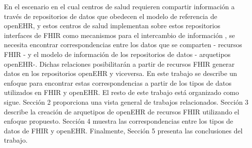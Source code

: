 En el escenario en el cual centros de salud requieren compartir información a través de repositorios de datos que obedecen el modelo de referencia de openEHR, y estos centros de salud implementan sobre estos repositorios interfaces de FHIR como mecanismos para el intercambio de información \cite{Lopez16}, se necesita encontrar correspondencias entre los datos que se comparten - recursos FHIR - y el modelo de información de los repositorios de datos - arquetipos openEHR-. Dichas relaciones posibilitarán a partir de recursos FHIR generar datos en los repositorios openEHR y viceversa. En este trabajo se describe un enfoque para encontrar estas correspondencias a partir de los tipos de datos utilizados en FHIR y openEHR. El resto de este trabajo está organizado como sigue. Sección 2 proporciona una vista general de trabajos relacionados. Sección 3 describe la creación de arquetipos de openEHR de recursos FHIR utilizando el enfoque propuesto. Sección 4 muestra las correspondencias entre los tipos de datos de FHIR y openEHR. Finalmente, Sección 5 presenta las conclusiones del trabajo.
